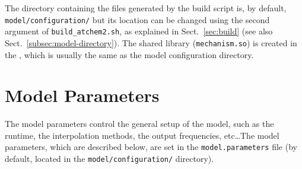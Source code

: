 The directory containing the files generated by the build script is,
by default, \texttt{model/configuration/} but its location can be
changed using the second argument of \texttt{build\_atchem2.sh}, as
explained in Sect.~\ref{sec:build} (see also Sect.~\ref{subsec:model-directory}).
The shared library (\texttt{mechanism.so}) is created in the
\sharedir, which is usually the same as the model configuration
directory.

\section{Model Parameters} \label{sec:model-parameters}

The model parameters control the general setup of the model, such as
the runtime, the interpolation methods, the output frequencies,
etc\ldots The model parameters, which are described below, are set in
the \texttt{model.parameters} file (by default, located in the
\texttt{model/configuration/} directory).

